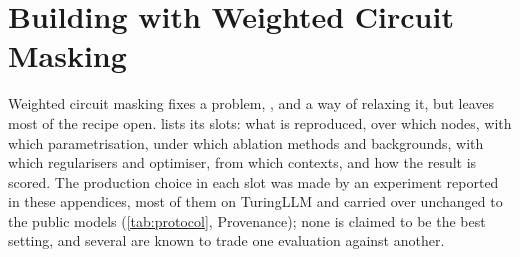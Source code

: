 \section{Building with Weighted Circuit Masking}
\label{app:framework}
Weighted circuit masking fixes a problem, , and a way of relaxing it, but leaves most of the recipe open.
 lists its slots: what is reproduced, over which nodes, with which parametrisation, under which ablation methods and backgrounds, with which regularisers and optimiser, from which contexts, and how the result is scored.
The production choice in each slot was made by an experiment reported in these appendices, most of them on TuringLLM and carried over unchanged to the public models (\cref{tab:protocol}, Provenance); none is claimed to be the best setting, and several are known to trade one evaluation against another.

